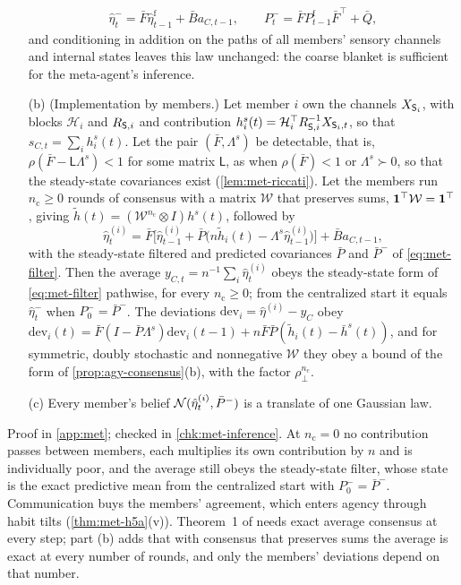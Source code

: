 \begin{proposition}
\begin{enumerate}
\begin{equation}
\begin{gathered}
\hat\eta^-_t=\bar F\hat\eta^{\mathrm f}_{t-1}+\bar Ba_{C,t-1},\qquad P^-_t=\bar FP^{\mathrm f}_{t-1}\bar F^\top+\bar Q,
\end{gathered}
\end{equation}
and conditioning in addition on the paths of all members' sensory channels and internal states leaves this law unchanged: the coarse blanket is sufficient for the meta-agent's inference.
\item[(b)] (Implementation by members.) Let member $i$ own the channels $X_{\mathsf{S}_i}$, with blocks $\mathcal H_i$ and $R_{\mathsf{S},i}$ and contribution $h^s_i(t)=\mathcal H_i^\top R_{\mathsf{S},i}^{-1}X_{\mathsf{S}_i,t}$, so that $s_{C,t}=\sum_ih^s_i(t)$. Let the pair $(\bar F,\Lambda^s)$ be detectable, that is, $\rho(\bar F-\mathsf L\Lambda^s)<1$ for some matrix $\mathsf L$, as when $\rho(\bar F)<1$ or $\Lambda^s\succ0$, so that the steady-state covariances exist (\cref{lem:met-riccati}). Let the members run $n_{\mathrm c}\ge0$ rounds of consensus with a matrix $\mathcal W$ that preserves sums, $\mathbf{1}^\top\mathcal W=\mathbf{1}^\top$, giving $\tilde h(t)=(\mathcal W^{n_{\mathrm c}}\otimes I)h^s(t)$, followed by
\begin{equation}\label{eq:met-member-filter}
\hat\eta^{(i)}_t=\bar F\bigl[\hat\eta^{(i)}_{t-1}+\bar P\bigl(n\tilde h_i(t)-\Lambda^s\hat\eta^{(i)}_{t-1}\bigr)\bigr]+\bar Ba_{C,t-1},
\end{equation}
with the steady-state filtered and predicted covariances $\bar P$ and $\bar P^-$ of \eqref{eq:met-filter}. Then the average $y_{C,t}=n^{-1}\sum_i\hat\eta^{(i)}_t$ obeys the steady-state form of \eqref{eq:met-filter} pathwise, for every $n_{\mathrm c}\ge0$; from the centralized start it equals $\hat\eta^-_t$ when $P^-_0=\bar P^-$. The deviations $\mathrm{dev}_i=\hat\eta^{(i)}-y_C$ obey $\mathrm{dev}_i(t)=\bar F(I-\bar P\Lambda^s)\mathrm{dev}_i(t-1)+n\bar F\bar P(\tilde h_i(t)-\bar h^s(t))$, and for symmetric, doubly stochastic and nonnegative $\mathcal W$ they obey a bound of the form of \cref{prop:agy-consensus}(b), with the factor $\rho_\perp^{n_{\mathrm c}}$.
\item[(c)] Every member's belief $\mathcal{N}(\hat\eta^{(i)}_t,\bar P^-)$ is a translate of one Gaussian law.
\end{enumerate}
\end{proposition}
Proof in \cref{app:met}; checked in \cref{chk:met-inference}. At $n_{\mathrm c}=0$ no contribution passes between members, each multiplies its own contribution by $n$ and is individually poor, and the average still obeys the steady-state filter, whose state is the exact predictive mean from the centralized start with $P^-_0=\bar P^-$. Communication buys the members' agreement, which enters agency through habit tilts (\cref{thm:met-h5a}(v)). Theorem~1 of \citet{olfatisaber2005distributed} needs exact average consensus at every step; part (b) adds that with consensus that preserves sums the average is exact at every number of rounds, and only the members' deviations depend on that number.

